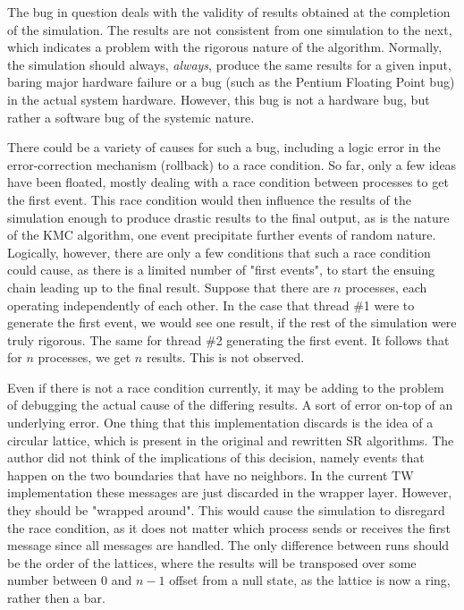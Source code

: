 The bug in question deals with the validity of results obtained at the completion of the simulation.  The results are not consistent from one simulation to the next, which indicates a problem with the rigorous nature of the algorithm.  Normally, the simulation should always, \textit{always}, produce the same results for a given input, baring major hardware failure or a bug (such as the Pentium Floating Point bug) in the actual system hardware.  However, this bug is not a hardware bug, but rather a software bug of the systemic nature.

There could be a variety of causes for such a bug, including a logic error in the error-correction mechanism (rollback) to a race condition.  So far, only a few ideas have been floated, mostly dealing with a race condition between processes to get the first event.  This race condition would then influence the results of the simulation enough to produce drastic results to the final output, as is the nature of the KMC algorithm, one event precipitate further events of random nature.  Logically, however, there are only a few conditions that such a race condition could cause, as there is a limited number of "first events", to start the ensuing chain leading up to the final result.  Suppose that there are $n$ processes, each operating independently of each other.  In the case that thread \#1 were to generate the first event, we would see one result, if the rest of the simulation were truly rigorous.  The same for thread \#2 generating the first event.  It follows that for $n$ processes, we get $n$ results.  This is not observed.

Even if there is not a race condition currently, it may be adding to the problem of debugging the actual cause of the differing results.  A sort of error on-top of an underlying error.  One thing that this implementation discards is the idea of a circular lattice, which is present in the original and rewritten SR algorithms.  The author did not think of the implications of this decision, namely events that happen on the two boundaries that have no neighbors.  In the current TW implementation these messages are just discarded in the wrapper layer.  However, they should be "wrapped around".  This would cause the simulation to disregard the race condition, as it does not matter which process sends or receives the first message since all messages are handled.  The only difference between runs should be the order of the lattices, where the results will be transposed over some number between $0$ and $n-1$ offset from a null state, as the lattice is now a ring, rather then a bar.

